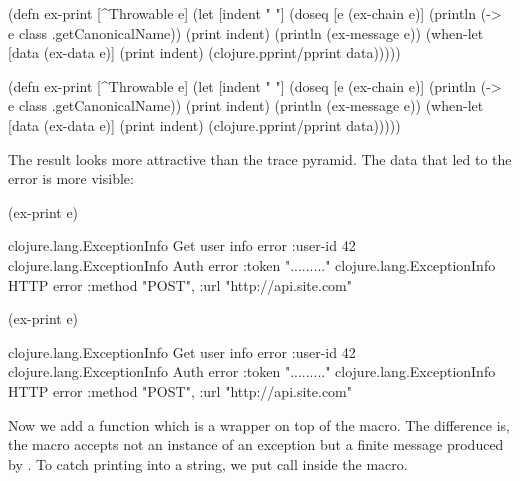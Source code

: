 
\ifnarrow

\begin{clojure}
(defn ex-print
  [^Throwable e]
  (let [indent "  "]
    (doseq [e (ex-chain e)]
      (println (-> e
                   class
                   .getCanonicalName))
      (print indent)
      (println (ex-message e))
      (when-let [data (ex-data e)]
        (print indent)
        (clojure.pprint/pprint data)))))
\end{clojure}

\else

\begin{clojure}
(defn ex-print
  [^Throwable e]
  (let [indent "  "]
    (doseq [e (ex-chain e)]
      (println (-> e class .getCanonicalName))
      (print indent)
      (println (ex-message e))
      (when-let [data (ex-data e)]
        (print indent)
        (clojure.pprint/pprint data)))))
\end{clojure}

\fi

The result looks more attractive than the trace pyramid. The data that led to the error is more visible:

\ifnarrow

\begin{clojure}
(ex-print e)

clojure.lang.ExceptionInfo
  Get user info error
  {:user-id 42}
clojure.lang.ExceptionInfo
  Auth error
  {:token "........."}
clojure.lang.ExceptionInfo
  HTTP error
  {:method "POST",
   :url "http://api.site.com"}
\end{clojure}

\else

\begin{clojure}
(ex-print e)

clojure.lang.ExceptionInfo
  Get user info error
  {:user-id 42}
clojure.lang.ExceptionInfo
  Auth error
  {:token "........."}
clojure.lang.ExceptionInfo
  HTTP error
  {:method "POST", :url "http://api.site.com"}
\end{clojure}

\fi


Now we add a  function which is a wrapper on top of the  macro. The difference is, the macro accepts not an instance of an exception but a finite message produced by . To catch printing into a string, we put  call inside the  macro.

